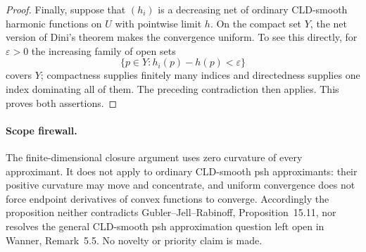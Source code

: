 \begin{proof}
Finally, suppose that $(h_i)$ is a decreasing net of ordinary CLD-smooth
harmonic functions on $U$ with pointwise limit $h$.  On the compact set
$Y$, the net version of Dini's theorem makes the convergence uniform.  To
see this directly, for $\varepsilon>0$ the increasing family of open sets
\[
              \{p\in Y:h_i(p)-h(p)<\varepsilon\}
\]
covers $Y$; compactness supplies finitely many indices and directedness
supplies one index dominating all of them.  The preceding contradiction
then applies.  This proves both assertions.
\end{proof}

\paragraph{Scope firewall.}
The finite-dimensional closure argument uses zero curvature of every
approximant.  It does not apply to ordinary CLD-smooth psh approximants:
their positive curvature may move and concentrate, and uniform convergence
does not force endpoint derivatives of convex functions to converge.
Accordingly the proposition neither contradicts Gubler--Jell--Rabinoff,
Proposition~15.11, nor resolves the general CLD-smooth psh approximation
question left open in Wanner, Remark~5.5.  No novelty or priority claim is
made.
